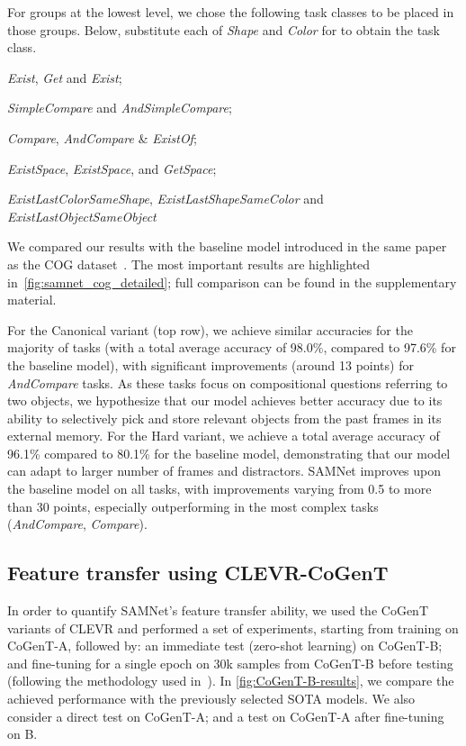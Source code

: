 For groups at the lowest level, we chose the following task classes to be placed in those groups.
Below, substitute each of \textit{Shape} and \textit{Color} for  \uX{} to obtain the task class.
\begin{description}
	\compresslist
	\item[Basic:] \textit{Exist}\uX, \textit{Get}\uX{} and \textit{Exist};
	\item[Obj-Attr:] \emph{SimpleCompare}\uX{} and \textit{AndSimpleCompare}\uX;
	\item[Compare:] \textit{Compare}\uX,  \textit{AndCompare}\uX{} \& \textit{Exist}\uX\textit{Of};
	\item[Spatial:] \textit{ExistSpace}, \textit{Exist}\uX\textit{Space}, and \textit{Get}\uX\textit{Space};
	\item[Cognitive:] \textit{ExistLastColorSameShape}, \textit{ExistLastShapeSameColor} and \textit{ExistLastObjectSameObject}
\end{description}


We compared our results with the baseline model introduced in the same paper as the COG dataset~\cite{yang2018dataset}.
The most important results are highlighted in~\cref{fig:samnet_cog_detailed}; full comparison can be found in the supplementary material.

For the Canonical variant (top row), we achieve similar accuracies for the majority of tasks (with a total average accuracy of 98.0\%, compared to 97.6\% for the baseline model), with significant improvements (around 13 points) for \textit{AndCompare} tasks.
As these tasks focus on compositional questions referring to two objects, we hypothesize that our model achieves better accuracy due to its ability to selectively pick and store relevant objects from the past frames in its external memory.
For the Hard variant, we achieve a total average accuracy of 96.1\% compared to 80.1\% for the baseline model, demonstrating that our model can adapt to larger number of frames and distractors.
SAMNet improves upon the baseline model on all tasks, with improvements varying from 0.5 to more than 30 points, especially outperforming in the most complex tasks (\textit{AndCompare}\uX, \textit{Compare}\uX).


\subsection{Feature transfer using CLEVR-CoGenT}
\label{sec:feature}

In order to quantify SAMNet's feature transfer ability, we used the CoGenT variants of CLEVR and performed a set of experiments, starting from training on CoGenT-A, followed by:
an immediate test (zero-shot learning) on CoGenT-B; and fine-tuning for a single epoch on 30k samples from CoGenT-B before testing (following the methodology used in~\cite{johnson2017inferring,mascharka2018transparency,perez2018film,marois2018transfer}).
In \cref{fig:CoGenT-B-results}, we compare the achieved performance with the previously selected SOTA models.
We also consider a direct test on CoGenT-A; and a test on CoGenT-A after fine-tuning on B.

